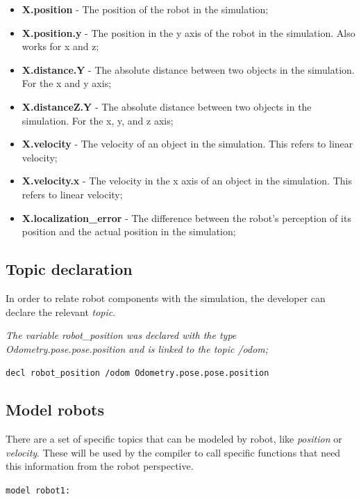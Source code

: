 \documentclass[runningheads]{llncs}
\begin{document}
\begin{itemize}
\item {\bfseries X.position} - The position of the robot in the simulation;
\item {\bfseries X.position.y} - The position in the y axis of the robot in the simulation. Also works for x and z;
\item {\bfseries X.distance.Y} - The absolute distance between two objects in the simulation. For the x and y axis;
\item {\bfseries X.distanceZ.Y} - The absolute distance between two objects in the simulation. For the x, y, and z axis;
\item {\bfseries X.velocity} - The velocity of an object in the simulation. This refers to linear velocity;
\item {\bfseries X.velocity.x} - The velocity in the x axis of an object in the simulation. This refers to linear velocity;
\item {\bfseries X.localization\_error} - The difference between the robot's perception of its position and the actual position in the simulation;
\end{itemize}


\subsection{Topic declaration}

In order to relate robot components with the simulation, the developer can declare the relevant \textit{topic}.

\textit{The variable robot\_position was declared with the type Odometry.pose.pose.position and is linked to the topic /odom;}

\vspace{3mm}

\texttt{decl robot\_position /odom Odometry.pose.pose.position}


\subsection{Model robots}

There are a set of specific topics that can be modeled by robot, like \textit{position} or \textit{velocity}. These will be used by the compiler to call specific functions that need this information from the robot perspective.

\vspace{3mm}

\texttt{model robot1:}
\end{document}
